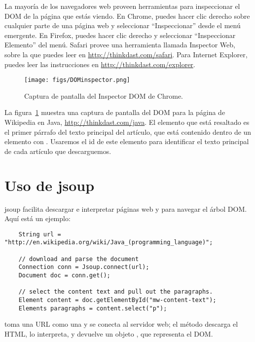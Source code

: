 \documentclass[12pt]{book}
\theoremstyle{exercise}
\begin{document}

La mayoría de los navegadores web proveen herramientas para inspeccionar el DOM de
la página que estás viendo. En Chrome, puedes hacer clic derecho sobre cualquier parte
de una página web y seleccionar ``Inspeccionar'' desde el menú emergente. En Firefox,
puedes hacer clic derecho y seleccionar ``Inspeccionar Elemento'' del menú. Safari
provee una herramienta llamada Inspector Web, sobre la que puedes leer en
\url{http://thinkdast.com/safari}.
Para Internet Explorer, puedes leer las instrucciones en
\url{http://thinkdast.com/explorer}.

\begin{figure}
\centering
\texttt{[image: figs/DOMinspector.png]}
\caption{Captura de pantalla del Inspector DOM de Chrome.}
\label{fig-dom2}
\end{figure}

La figura~\ref{fig-dom2}
muestra una captura de pantalla del DOM para la página de Wikipedia en Java,
\url{http://thinkdast.com/java}.
El elemento que está resaltado es el primer párrafo del texto principal
del artículo, que está contenido dentro de un
elemento  con
. Usaremos el id de este elemento para identificar el
texto principal de cada artículo que descarguemos.




\section{Uso de jsoup}
\label{using-jsoup}

jsoup facilita descargar e interpretar páginas web y para navegar el árbol
DOM. Aquí está un ejemplo:

\begin{verbatim}
    String url = "http://en.wikipedia.org/wiki/Java_(programming_language)";

    // download and parse the document
    Connection conn = Jsoup.connect(url);
    Document doc = conn.get();

    // select the content text and pull out the paragraphs.
    Element content = doc.getElementById("mw-content-text");
    Elements paragraphs = content.select("p");
\end{verbatim}

 toma una URL como una  y se conecta al
servidor web; el método  descarga el HTML, lo interpreta,
y devuelve un objeto , que representa el DOM.
\end{document}

